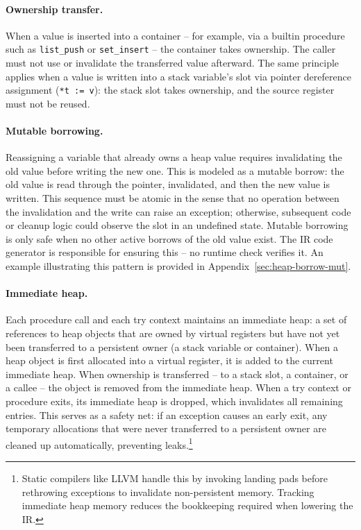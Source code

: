 \paragraph{Ownership transfer.}
When a value is inserted into a container -- for example, via a builtin procedure such as \texttt{list\_push} or \texttt{set\_insert} -- the container takes ownership. The caller must not use or invalidate the transferred value afterward. The same principle applies when a value is written into a stack variable's slot via pointer dereference assignment (\texttt{*t := v}): the stack slot takes ownership, and the source register must not be reused.

\paragraph{Mutable borrowing.}
Reassigning a variable that already owns a heap value requires invalidating the old value before writing the new one. This is modeled as a mutable borrow: the old value is read through the pointer, invalidated, and then the new value is written. This sequence must be atomic in the sense that no operation between the invalidation and the write can raise an exception; otherwise, subsequent code or cleanup logic could observe the slot in an undefined state. Mutable borrowing is only safe when no other active borrows of the old value exist. The \ac{IR} code generator is responsible for ensuring this -- no runtime check verifies it. An example illustrating this pattern is provided in Appendix~\ref{sec:heap-borrow-mut}.

\paragraph{Immediate heap.}
Each procedure call and each try context maintains an immediate heap: a set of references to heap objects that are owned by virtual registers but have not yet been transferred to a persistent owner (a stack variable or container). When a heap object is first allocated into a virtual register, it is added to the current immediate heap. When ownership is transferred -- to a stack slot, a container, or a callee -- the object is removed from the immediate heap. When a try context or procedure exits, its immediate heap is dropped, which invalidates all remaining entries. This serves as a safety net: if an exception causes an early exit, any temporary allocations that were never transferred to a persistent owner are cleaned up automatically, preventing leaks.\footnote{Static compilers like LLVM handle this by invoking landing pads before rethrowing exceptions to invalidate non-persistent memory. Tracking immediate heap memory reduces the bookkeeping required when lowering the \ac{IR}.}

